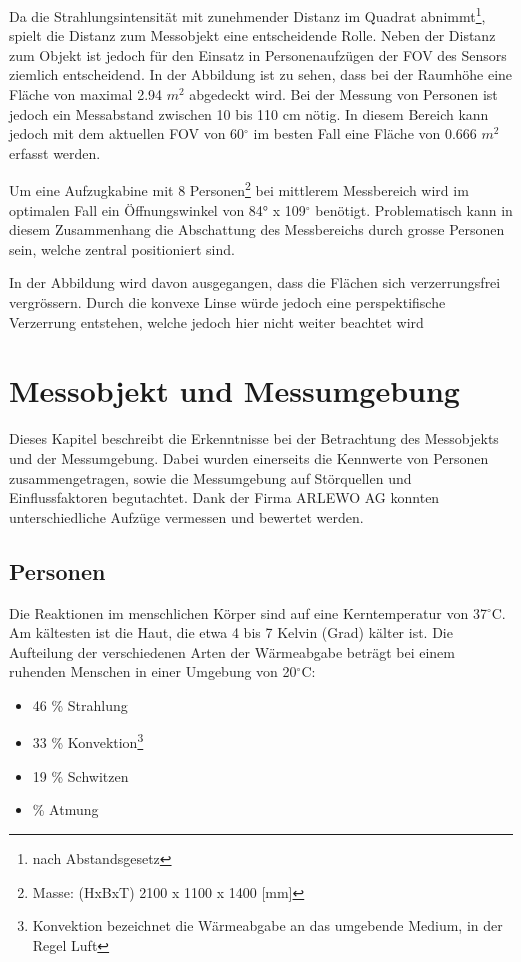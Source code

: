 Da die Strahlungsintensität mit zunehmender Distanz im Quadrat abnimmt\footnote[6]{nach Abstandsgesetz}, spielt die Distanz zum Messobjekt eine entscheidende Rolle. Neben der Distanz zum Objekt ist jedoch für den Einsatz in Personenaufzügen der \ac{FOV} des Sensors ziemlich entscheidend. In der Abbildung ist zu sehen, dass bei der Raumhöhe eine Fläche von maximal 2.94 $m^2$ abgedeckt wird. Bei der Messung von Personen ist jedoch ein Messabstand zwischen 10 bis 110 cm nötig. In diesem Bereich kann jedoch mit dem aktuellen \ac{FOV} von 60$^\circ$ im besten Fall eine Fläche von 0.666 $m^2$ erfasst werden.

Um eine Aufzugkabine mit 8 Personen\footnote[7]{Masse: (HxBxT) 2100 x 1100 x 1400 [mm]} bei mittlerem Messbereich wird im optimalen Fall ein Öffnungswinkel von 84° x 109$^\circ$ benötigt. Problematisch kann in diesem Zusammenhang die Abschattung des Messbereichs durch grosse Personen sein, welche zentral positioniert sind.

In der Abbildung wird davon ausgegangen, dass die Flächen sich verzerrungsfrei vergrössern. Durch die konvexe Linse würde jedoch eine perspektifische Verzerrung entstehen, welche jedoch hier nicht weiter beachtet wird


\section{Messobjekt und Messumgebung}
\label{sec:Messobjekt}
Dieses Kapitel beschreibt die Erkenntnisse bei der Betrachtung des Messobjekts und der Messumgebung. Dabei wurden einerseits die Kennwerte von Personen zusammengetragen, sowie die Messumgebung auf Störquellen und Einflussfaktoren begutachtet. Dank der Firma ARLEWO AG konnten unterschiedliche Aufzüge vermessen und bewertet werden. 

\subsection{Personen}
\label{subsec:Personen}
Die Reaktionen im menschlichen Körper sind auf eine Kerntemperatur von 37$^\circ$C. Am kältesten ist die Haut, die etwa 4 bis 7 Kelvin (Grad) kälter ist. Die Aufteilung der verschiedenen Arten der Wärmeabgabe beträgt bei einem ruhenden Menschen in einer Umgebung von 20$^\circ$C:
\begin{itemize}
	\item 46 \% Strahlung
	\item 33 \% Konvektion\footnote[8]{Konvektion bezeichnet die Wärmeabgabe an
		das umgebende Medium, in der Regel Luft}
	\item 19 \% Schwitzen
	\item {} \% Atmung
\end{itemize}

